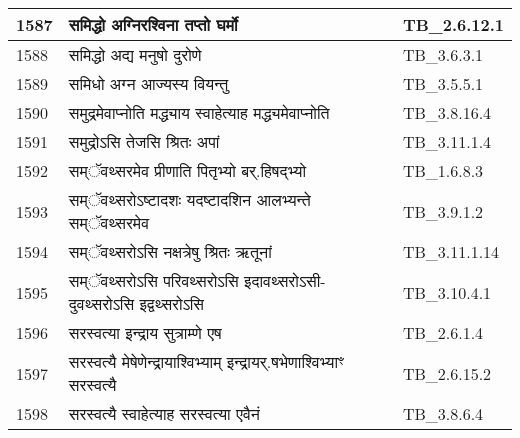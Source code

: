 \documentclass[17pt]{extarticle}
\begin{document}
\begin{longtable}{||p{0.4in}||p{4.9in}||p{0.9in}||}
    \hline
        
    1587 & समिद्धो अग्निरश्विना तप्तो घर्मो & TB\_2.6.12.1       \\
    
    \hline
        
    1588 & समिद्धो अद्य मनुषो दुरोणे & TB\_3.6.3.1       \\
    
    \hline
        
    1589 & समिधो अग्न आज्यस्य वियन्तु & TB\_3.5.5.1       \\
    
    \hline
        
    1590 & समुद्रमेवाप्नोति मद्ध्याय स्वाहेत्याह मद्ध्यमेवाप्नोति & TB\_3.8.16.4       \\
    
    \hline
        
    1591 & समुद्रोऽसि तेजसि श्रितः अपां & TB\_3.11.1.4       \\
    
    \hline
        
    1592 & सम्ॅवथ्सरमेव प्रीणाति पितृभ्यो बर्.हिषद्भ्यो & TB\_1.6.8.3       \\
    
    \hline
        
    1593 & सम्ॅवथ्सरोऽष्टादशः यदष्टादशिन आलभ्यन्ते सम्ॅवथ्सरमेव & TB\_3.9.1.2       \\
    
    \hline
        
    1594 & सम्ॅवथ्सरोऽसि नक्षत्रेषु श्रितः ऋतूनां & TB\_3.11.1.14       \\
    
    \hline
        
    1595 & सम्ॅवथ्सरोऽसि परिवथ्सरोऽसि इदावथ्सरोऽसी{-}दुवथ्सरोऽसि इद्वथ्सरोऽसि & TB\_3.10.4.1       \\
    
    \hline
        
    1596 & सरस्वत्या इन्द्राय सुत्राम्णे एष & TB\_2.6.1.4       \\
    
    \hline
        
    1597 & सरस्वत्यै मेषेणेन्द्रायाश्विभ्याम् इन्द्रायर्.षभेणाश्विभ्याꣳ सरस्वत्यै & TB\_2.6.15.2       \\
    
    \hline
        
    1598 & सरस्वत्यै स्वाहेत्याह सरस्वत्या एवैनं & TB\_3.8.6.4       \\
    

\end{longtable}
\end{document}
